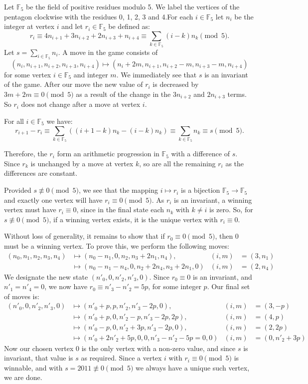 \begin{enumerate}
Let $\mathbb{F}_5$ be the field of positive residues modulo 5. We label the vertices of the pentagon clockwise with the residues 0, 1, 2, 3 and 4.For each $i \in \mathbb{F}_5$ let $n_i$ be the integer at vertex $i$ and let $r_i \in \mathbb{F}_5$ be defined as:
 \[r_i   \equiv 4n_{i+1} + 3n_{i+2} + 2n_{i+3} + n_{i+4}   \equiv \sum_{k\in\mathbb{F}_5}(i-k)n_k \pmod 5.\]Let $s = \sum_{i\in\mathbb{F}_5} n_i$. A move in the game consists of
 \[(n_i, n_{i+1}, n_{i+2}, n_{i+3}, n_{i+4}) \mapsto (n_i + 2m, n_{i+1}, n_{i+2} - m, n_{i+3} - m, n_{i+4})\]for some vertex $i \in \mathbb{F}_5$ and integer $m$. We immediately see that $s$ is an invariant of the game. After our move the new value of $r_i$ is decreased by $3m + 2m \equiv 0 \pmod 5$ as a result of the change in the $3n_{i+2}$ and $2n_{i+3}$ terms. So $r_i$ does not change after a move at vertex $i$.

 For all $i \in \mathbb{F}_5$ we have:
 \[r_{i+1} - r_i   \equiv \sum_{k\in\mathbb{F}_5} ((i+1-k)n_k - (i-k)n_k)   \equiv \sum_{k\in\mathbb{F}_5} n_k \equiv s \pmod 5.\]

 Therefore, the $r_i$ form an arithmetic progression in $\mathbb{F}_5$ with a difference of $s$. Since $r_k$ is unchanged by a move at vertex $k$, so are all the remaining $r_i$ as the differences are constant.

 Provided $s \not\equiv 0 \pmod 5$, we see that the mapping $i \mapsto r_i$ is a bijection $\mathbb{F}_5 \to \mathbb{F}_5$ and exactly one vertex will have $r_i \equiv 0 \pmod 5$. As $r_i$ is an invariant, a winning vertex must have $r_i \equiv 0$, since in the final state each $n_k$ with $k \ne i$ is zero. So, for $s \not\equiv 0 \pmod 5$, if a winning vertex exists, it is the unique vertex with $r_i \equiv 0$.

 Without loss of generality, it remains to show that if $r_0 \equiv 0 \pmod 5$, then 0 must be a winning vertex. To prove this, we perform the following moves:
 \begin{align*} (n_0, n_1, n_2, n_3, n_4) &\mapsto (n_0-n_1, 0, n_2, n_3 + 2n_1, n_4), & (i, m) &= (3, n_1) \\  &\mapsto (n_0-n_1-n_4, 0, n_2+2n_4, n_3 +2n_1, 0) & (i, m) &= (2, n_4) \end{align*}
We designate the new state $(n'_0, 0, n'_2, n'_3, 0)$. Since $r_0 \equiv 0$ is an invariant, and $n'_1 = n'_4 = 0$, we now have $r_0 \equiv n'_3 - n'_2 = 5p$, for some integer $p$. Our final set of moves is:
 \begin{align*} (n'_0, 0, n'_2, n'_3, 0) &\mapsto (n'_0+p, p, n'_2, n'_3 - 2p, 0), & (i, m) &= (3, -p)\\  &\mapsto (n'_0+p, 0, n'_2-p, n'_3 - 2p, 2p), & (i, m) &= (4, p) \\  &\mapsto (n'_0-p, 0, n'_2+3p, n'_3 - 2p, 0), & (i, m) &= (2, 2p)\\  &\mapsto (n'_0+2n'_2 + 5p, 0, 0, n'_3-n'_2 - 5p = 0, 0) & (i, m) &= (0, n'_2 + 3p) \end{align*}
Now our chosen vertex 0 is the only vertex with a non-zero value, and since $s$ is invariant, that value is $s$ as required. Since a vertex $i$ with $r_i \equiv 0 \pmod 5$ is winnable, and with $s = 2011 \not\equiv 0 \pmod 5$ we always have a unique such vertex, we are done.


\end{enumerate}
